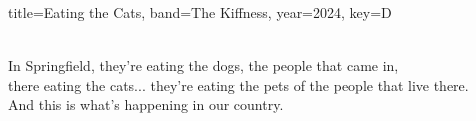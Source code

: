 \documentclass{skrul-leadsheet}
\begin{document}
\begin{song}[transpose-capo=true]{title={Eating the Cats}, band={The Kiffness}, year={2024}, key={D}}
\begin{chorus}
\end{chorus}

\begin{outro}
 \\
In Springfield, they're eating the dogs, the people that came in, \\
there eating the cats... they're eating the pets of the people that live there.\\
And this is what's happening in our country.
\end{outro}

\end{song}
\end{document}
